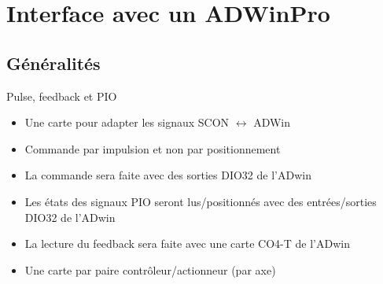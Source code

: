 \documentclass[a4paper,11pt]{beamer}
\begin{document}
\section{Interface avec un ADWinPro}
\subsection{Généralités}
\begin{frame}
	\begin{block}{Pulse, feedback et PIO}
	\justifying
		\begin{itemize}
			\item Une carte pour adapter les signaux SCON $\leftrightarrow$ ADWin
			\item Commande par impulsion et non par positionnement
			\item La commande sera faite avec des sorties DIO32 de l'ADwin
			\item Les états des signaux PIO seront lus/positionnés avec des entrées/sorties DIO32 de l'ADwin
			\item La lecture du feedback sera faite avec une carte CO4-T de l'ADwin
			\item Une carte par paire contrôleur/actionneur (par axe)
		\end{itemize}
	\end{block}
\end{frame}
\end{document}
